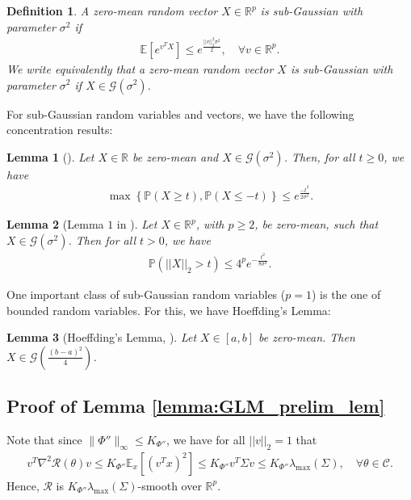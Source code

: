 \documentclass{article}
\newtheorem{lemma}{Lemma}
\newtheorem{definition}{Definition}[section]
\begin{document}
\begin{definition}
A zero-mean random vector $X \in \mathbb{R}^p$ is sub-Gaussian with parameter $\sigma^2$ if
\begin{align*}
\mathbb{E}[e^{v^T X}] \leq e^\frac{||v||_2^2\sigma^2}{2}, \quad \forall v \in \mathbb{R}^p.
\end{align*}
We write equivalently that a zero-mean random vector $X$ is sub-Gaussian with parameter $\sigma^2$ if $X \in \mathcal{G}\left(\sigma^2\right)$.
\end{definition}
For sub-Gaussian random variables and vectors, we have the following concentration results:
\begin{lemma}[\cite{SG_DEF}]
\label{lemma:SG_conc_variable}
Let $X \in \mathbb{R}$ be zero-mean and $X \in \mathcal{G}(\sigma^2)$. Then, for all $t \geq 0$, we have
\begin{align*}
\max\left\{\mathbb{P}(X \geq t), \mathbb{P}(X \leq - t)\right\} \leq e^{\frac{-t^2}{2\sigma^2}}.
\end{align*}
\end{lemma}
\begin{lemma}[Lemma $1$ in \cite{CIGauss}]
\label{lemma:CIGV}
Let $X \in \mathbb{R}^p$, with $p \geq 2$, be zero-mean, such that $X \in \mathcal{G}(\sigma^2)$. Then for all $t > 0$, we have 
\begin{align*}
\mathbb{P}\left(||X||_2 > t\right) \leq 4^pe^{-\frac{t^2}{8\sigma^2}}.
\end{align*}
\end{lemma}
One important class of sub-Gaussian random variables ($p = 1$) is the one of bounded random variables. For this, we have Hoeffding's Lemma:

\begin{lemma}[Hoeffding's Lemma, \cite{Hoeff}]
Let $X \in [a, b]$ be zero-mean. Then $X \in \mathcal{G}\left(
\frac{(b - a)^2}{4}\right)$.
\end{lemma}

\subsection{Proof of Lemma \ref{lemma:GLM_prelim_lem}}\label{sec:Proof_GLM_prelim_lemma}

Note that since $\|\Phi''\|_\infty \leq K_{\Phi''}$, we have for all $||v||_2 = 1$ that
\begin{align*}
v^T\nabla^2\mathcal{R}(\theta)v \leq K_{\Phi''}\mathbb{E}_x[(v^Tx)^2]\leq K_{\Phi''}v^T\Sigma v \leq K_{\Phi''}\lambda_{\max}(\Sigma), \quad \forall \theta \in \mathcal{C}.
\end{align*}
Hence, $\mathcal{R}$ is $K_{\Phi''}\lambda_{\max}(\Sigma)$-smooth over $\mathbb{R}^p$. 
\end{document}
